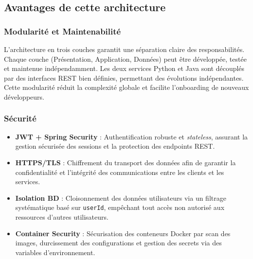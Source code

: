 \subsection{Avantages de cette architecture }
\subsubsection{Modularité et Maintenabilité}
L'architecture en trois couches garantit une séparation claire des responsabilités. Chaque couche (Présentation, Application, Données) peut être développée, testée et maintenue indépendamment. Les deux services Python et Java sont découplés par des interfaces REST bien définies, permettant des évolutions indépendantes. Cette modularité réduit la complexité globale et facilite l'onboarding de nouveaux développeurs.
\subsubsection{Sécurité}
\begin{itemize}
    \item \textbf{JWT + Spring Security} : Authentification robuste et \textit{stateless}, assurant la gestion sécurisée des sessions et la protection des endpoints REST.
    
    \item \textbf{HTTPS/TLS} : Chiffrement du transport des données afin de garantir la confidentialité et l’intégrité des communications entre les clients et les services.
    
    \item \textbf{Isolation BD} : Cloisonnement des données utilisateurs via un filtrage systématique basé sur \texttt{userId}, empêchant tout accès non autorisé aux ressources d’autres utilisateurs.
    
    \item \textbf{Container Security} : Sécurisation des conteneurs Docker par scan des images, durcissement des configurations et gestion des secrets via des variables d’environnement.
\end{itemize}
